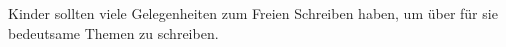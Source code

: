 Kinder sollten viele Gelegenheiten zum Freien Schreiben haben, um über für sie bedeutsame Themen zu schreiben.